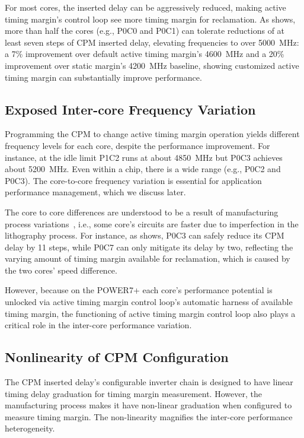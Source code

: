 For most cores, the inserted delay can be aggressively reduced, making active timing margin's control loop see more timing margin for reclamation. As  shows, more than half the cores (e.g., P0C0 and P0C1) can tolerate reductions of at least seven steps of CPM inserted delay, elevating frequencies to over 5000~MHz: a 7\% improvement over default active timing margin's 4600~MHz and a 20\% improvement over static margin's 4200~MHz baseline, showing customized active timing margin can substantially improve performance.

\subsection{Exposed Inter-core Frequency Variation}
\label{sec:process:idle:heterogeneity}

Programming the CPM to change active timing margin operation yields different frequency levels for each core, despite the performance improvement. For instance, at the idle limit P1C2 runs at about 4850~MHz but P0C3 achieves about 5200~MHz. Even within a chip, there is a wide range (e.g., P0C2 and P0C3). The core-to-core frequency variation is essential for application performance management, which we discuss later.

The core to core differences are understood to be a result of manufacturing process variations~\cite{dighe2010within,rangan2011achieving}, i.e., some core's circuits are faster due to imperfection in the lithography process. For instance, as  shows, P0C3 can safely reduce its CPM delay by 11 steps, while P0C7 can only mitigate its delay by two, reflecting the varying amount of timing margin available for reclamation, which is caused by the two cores' speed difference.

However, because on the POWER7+ each core's performance potential is unlocked via active timing margin control loop's automatic harness of available timing margin, the functioning of active timing margin control loop also plays a critical role in the inter-core performance variation.

\subsection{Nonlinearity of CPM Configuration}
\label{sec:process:idle:cpm_variation}

The CPM inserted delay's configurable inverter chain is designed to have linear timing delay graduation for timing margin measurement. However, the manufacturing process makes it have non-linear graduation when configured to measure timing margin. The non-linearity magnifies the inter-core performance heterogeneity.

